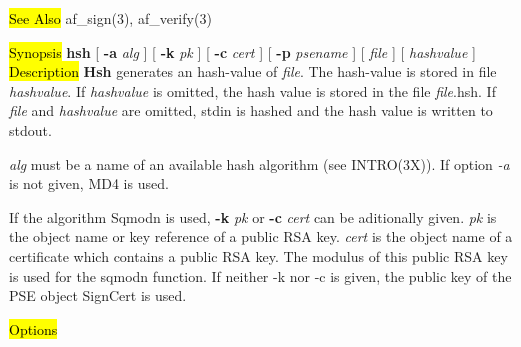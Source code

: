 





\hl{See Also}
af\_sign(3), af\_verify(3)

\label{hsh}
\hl{Synopsis}
{\bf hsh} [ {\bf -a} {\em alg} ] [ {\bf -k} {\em pk} ] [ {\bf -c} {\em cert} ] [ {\bf -p} {\em psename} ] [ {\em file} ] [ 
{\em hashvalue} ] \\
\hl{Description}
{\bf Hsh} generates an hash-value of {\em file}. The hash-value is stored in file {\em hashvalue}.
If {\em hashvalue} is omitted, 
the hash value is stored in the file {\em file}.hsh. If {\em file} and {\em hashvalue} are omitted, stdin is 
hashed and 
the hash value is written to stdout.

{\em alg} must be a name of an available hash algorithm (see INTRO(3X)). If option
{\em -a} is not given, MD4 is used.

If the algorithm Sqmodn is used, {\bf -k} {\em pk} or {\bf -c} {\em cert}
can be aditionally given. {\em pk} is the object name or key reference of a public RSA key.
{\em cert} is the object name of a certificate which contains a public RSA
key. The modulus of this public RSA key is used for the sqmodn function. If neither -k nor -c
is given, the public key of the PSE object SignCert is used. 

\hl{Options}


  
